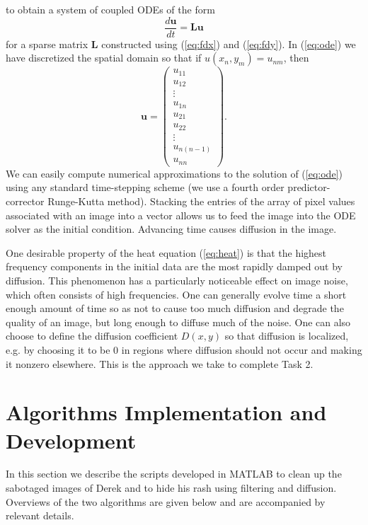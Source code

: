 \documentclass[fleqn,10pt]{../SelfArx} %
\begin{document}
to obtain a system of coupled ODEs of the form
\begin{equation}\label{eq:ode}
	\frac{d\boldsymbol{u}}{d t} = \boldsymbol{L}\boldsymbol{u}
\end{equation}
for a sparse matrix $\boldsymbol{L}$ constructed using (\ref{eq:fdx}) and (\ref{eq:fdy}). In (\ref{eq:ode}) we have discretized the spatial domain so that if $u(x_n,y_m) = u_{nm}$, then 
\begin{equation}
	\boldsymbol{u} = \left( \begin{array}{c} u_{11} \\ u_{12} \\ \vdots \\ u_{1n} \\ u_{21} \\ u_{22} \\ \vdots \\ u_{n(n-1)} \\ u_{nn} \end{array} \right).
\end{equation}
We can easily compute numerical approximations to the solution of (\ref{eq:ode}) using any standard time-stepping scheme (we use a fourth order predictor-corrector Runge-Kutta method). Stacking the entries of the array of pixel values associated with an image into a vector allows us to feed the image into the ODE solver as the initial condition. Advancing time causes diffusion in the image.

One desirable property of the heat equation (\ref{eq:heat}) is that the highest frequency components in the initial data are the most rapidly damped out by diffusion. This phenomenon has a particularly noticeable effect on image noise, which often consists of high frequencies. One can generally evolve time a short enough amount of time so as not to cause too much diffusion and degrade the quality of an image, but long enough to diffuse much of the noise. One can also choose to define the diffusion coefficient $D(x,y)$ so that diffusion is localized, e.g. by choosing it to be 0 in regions where diffusion should not occur and making it nonzero elsewhere. This is the approach we take to complete Task 2.



\section{Algorithms Implementation and Development} %
\label{sec:algorithms_implementation_and_development}
In this section we describe the scripts developed in MATLAB to clean up the sabotaged images of Derek and to hide his rash using filtering and diffusion. Overviews of the two algorithms are given below and are accompanied by relevant details.
\end{document}
